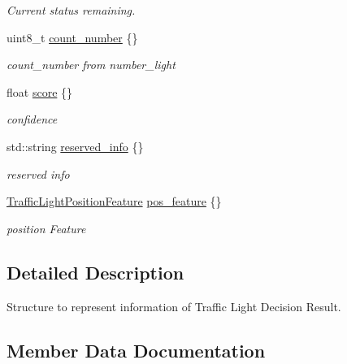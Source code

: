 \begin{DoxyCompactItemize}
\begin{DoxyCompactList}\small\item\em Current status remaining. \end{DoxyCompactList}\item 
uint8\+\_\+t \hyperlink{structmaf__perception__interface_1_1TrafficLightDecision_a8b302ccaac0f34c85913e4f6699ab5e4}{count\+\_\+number} \{\}
\begin{DoxyCompactList}\small\item\em count\+\_\+number from number\+\_\+light \end{DoxyCompactList}\item 
float \hyperlink{structmaf__perception__interface_1_1TrafficLightDecision_a7c88ce017daf53202956746dc9ee5cbf}{score} \{\}
\begin{DoxyCompactList}\small\item\em confidence \end{DoxyCompactList}\item 
std\+::string \hyperlink{structmaf__perception__interface_1_1TrafficLightDecision_a0801a795fec18436bb2e7dfca99a70ba}{reserved\+\_\+info} \{\}
\begin{DoxyCompactList}\small\item\em reserved info \end{DoxyCompactList}\item 
\hyperlink{structmaf__perception__interface_1_1TrafficLightPositionFeature}{Traffic\+Light\+Position\+Feature} \hyperlink{structmaf__perception__interface_1_1TrafficLightDecision_af5f7f3dd3295862c5629c1efe224bd3c}{pos\+\_\+feature} \{\}
\begin{DoxyCompactList}\small\item\em position Feature \end{DoxyCompactList}\end{DoxyCompactItemize}


\subsection{Detailed Description}
Structure to represent information of Traffic Light Decision Result. 

\subsection{Member Data Documentation}
\mbox{\label{structmaf__perception__interface_1_1TrafficLightDecision_a67c958a0a1421fe628ad70baed1baa45}} 
